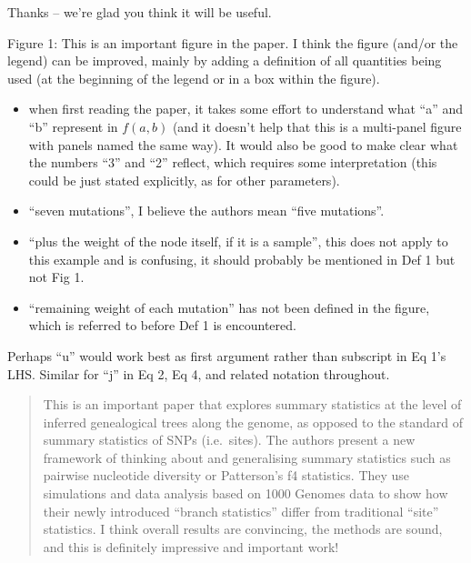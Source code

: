 Thanks -- we're glad you think it will be useful.

\begin{point}{Figure 1:}
    This is an important figure in the paper. I think the figure (and/or the legend) can be improved, mainly by adding a definition of all quantities being used (at the beginning of the legend or in a box within the figure).
    \begin{itemize}
        \item when first reading the paper, it takes some effort to understand what ``a'' and ``b'' represent in $f(a,b)$
            (and it doesn't help that this is a multi-panel figure with panels named the same way).
            It would also be good to make clear what the numbers ``3'' and ``2'' reflect, which requires some interpretation (this could be just stated explicitly, as for other parameters).
        \item ``seven mutations'', I believe the authors mean ``five mutations''.
        \item ``plus the weight of the node itself, if it is a sample'', this does not apply to this example and is confusing, it should probably be mentioned in Def 1 but not Fig 1.
        \item ``remaining weight of each mutation'' has not been defined in the figure, which is referred to before Def 1 is encountered.
    \end{itemize}
\end{point}


\begin{point}{}
    Perhaps ``u'' would work best as first argument rather than subscript in Eq 1's LHS. Similar for ``j'' in Eq 2, Eq 4, and related notation throughout.
\end{point}






\begin{quote}
This is an important paper that explores summary statistics at the level of inferred genealogical trees along the genome, as opposed to the standard of summary statistics of SNPs (i.e.\ sites).
The authors present a new framework of thinking about and generalising summary statistics such as pairwise nucleotide diversity or Patterson's f4 statistics.
They use simulations and data analysis based on 1000 Genomes data to show how their newly introduced ``branch statistics'' differ from traditional ``site'' statistics.
I think overall results are convincing, the methods are sound, and this is definitely impressive and important work!
\end{quote}

